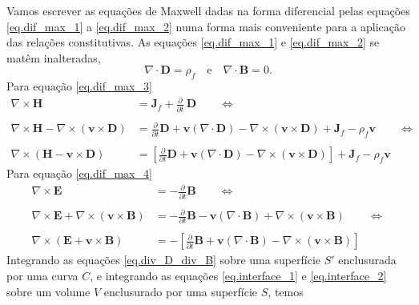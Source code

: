 Vamos escrever as equa\c{c}\~oes de Maxwell dadas na forma diferencial pelas equa\c{c}\~oes \ref{eq.dif_max_1} a \ref{eq.dif_max_2} numa forma mais conveniente para a aplica\c{c}\~ao das rela\c{c}\~oes constitutivas. As equa\c{c}\~oes \ref{eq.dif_max_1} e \ref{eq.dif_max_2} se mat\^em inalteradas,
\begin{equation}\label{eq.div_D_div_B}
\nabla\cdot\mathbf{D}=\rho_f\quad\text{e}\quad\nabla\cdot\mathbf{B}=0.
\end{equation}
Para equa\c{c}\~ao \ref{eq.dif_max_3}
\begin{align}\label{eq.interface_1}\nonumber
\nabla\times\mathbf{H}&=\mathbf{J}_f+\frac{\partial}{\partial t}\,\mathbf{D}\qquad\Leftrightarrow\\\nonumber\\
\nabla\times\mathbf{H}-\nabla\times(\mathbf{v}\times\mathbf{D})&=\frac{\partial}{\partial t}\mathbf{D}+\mathbf{v}(\nabla\cdot\mathbf{D})-\nabla\times(\mathbf{v}\times\mathbf{D})+\mathbf{J}_f-\rho_f\mathbf{v}\qquad\Leftrightarrow\\\nonumber\\
\nabla\times(\mathbf{H}-\mathbf{v}\times\mathbf{D})&=\left[\frac{\partial}{\partial t}\mathbf{D}+\mathbf{v}(\nabla\cdot\mathbf{D})-\nabla\times(\mathbf{v}\times\mathbf{D})\right]+\mathbf{J}_f-\rho_f\mathbf{v}
\end{align}
Para equa\c{c}\~ao \ref{eq.dif_max_4}
\begin{align}\label{eq.interface_2}\nonumber
\nabla\times\mathbf{E}&=-\frac{\partial}{\partial t}\mathbf{B}\qquad\Leftrightarrow\\\nonumber\\
\nabla\times\mathbf{E}+\nabla\times(\mathbf{v}\times\mathbf{B})&=-\frac{\partial}{\partial t}\mathbf{B}-\mathbf{v}(\nabla\cdot\mathbf{B})+\nabla\times(\mathbf{v}\times\mathbf{B})\qquad\Leftrightarrow\\\nonumber\\
\nabla\times(\mathbf{E}+\mathbf{v}\times\mathbf{B})&=-\left[\frac{\partial}{\partial t}\mathbf{B}+\mathbf{v}(\nabla\cdot\mathbf{B})-\nabla\times(\mathbf{v}\times\mathbf{B})\right]
\end{align}
Integrando as equa\c{c}\~oes \ref{eq.div_D_div_B} sobre uma superf\'icie $S'$ enclusurada por uma curva $C$, e integrando as equa\c{c}\~oes \ref{eq.interface_1} e \ref{eq.interface_2} sobre um volume $V$ enclusurado por uma superf\'icie $S$, temos
